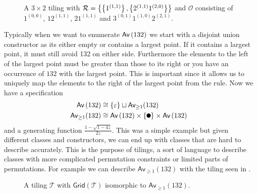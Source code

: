\begin{figure}[ht!]
    \centering
    
    \caption{A $3 \times 2$ tiling with $\mathcal{R} = \left\{\left\{1^{(1,1)}\right\}, \left\{2^{(1,1)}1^{(2,0)}\right\}\right\}$ and $\mathcal{O}$ consisting of $1^{(0,0)}$, $12^{(1,1)}$, $21^{(1,1)}$ and $3^{(0,1)}1^{(1,0)}2^{(2,1)}$.}
    \label{fig:tiling_example}
\end{figure}

Typically when we want to enumerate $\textsf{Av}\left(132\right)$ we start with a disjoint union constructor as its either empty or contains a largest point. If it contains a largest point, it must still avoid 132 on either side. Furthermore the elements to the left of the largest point must be greater than those to its right or you have an occurrence of $132$ with the largest point. This is important since it allows us to uniquely map the elements to the right of the largest point from the rule. Now we have a specification
\begin{align*}
\Av{132} &\cong \set{\varepsilon} \sqcup \textsf{Av}_{\geq1}(132)\\
\textsf{Av}_{\geq1}(132) &\cong \Av{132} \times \set{\point{0.1}} \times \Av{132}
\end{align*}
and a generating function $\frac{1-\sqrt{1-4z}}{2z}$. This was a simple example but given different classes and constructors, we can end up with classes that are hard to describe accurately. This is the purpose of tilings, a sort of language to describe classes with more complicated permutation constraints or limited parts of permutations. For example we can describe $\textsf{Av}_{\geq1}(132)$ with the tiling seen in .

\begin{figure}[ht!]
    \centering
    
    \caption{A tiling $\mathcal{T}$ with $\textsf{Grid}(\mathcal{T})$ isomorphic to $\textsf{Av}_{\geq1}(132)$.}
    \label{fig:tiling132}
\end{figure}